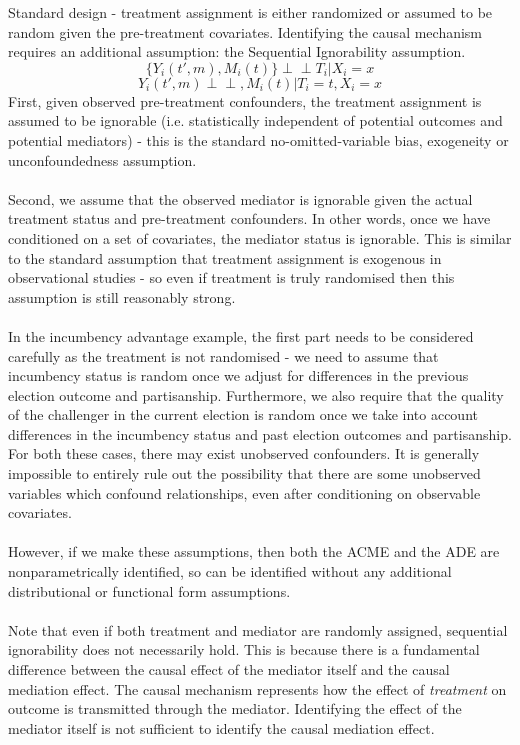 \documentclass{article}
\newcommand{\indep}{\perp\!\!\!\!\perp}
\begin{document}
	Standard design - treatment assignment is either randomized or assumed to be random given the pre-treatment covariates. Identifying the causal mechanism requires an additional assumption: the Sequential Ignorability assumption. 
	\begin{equation}
		\{Y_i(t',m), M_i(t)\} \indep T_i | X_i = x 
	\end{equation}
	\begin{equation}
		Y_i(t',m) \indep , M_i(t) | T_i =t, X_i = x 
	\end{equation}
	First, given observed pre-treatment confounders, the treatment assignment is assumed to be ignorable (i.e. statistically independent of potential outcomes and potential mediators) - this is the standard no-omitted-variable bias, exogeneity or unconfoundedness assumption. 
	\\~\\
	Second, we assume that the observed mediator is ignorable given the actual treatment status and pre-treatment confounders. In other words, once we have conditioned on a set of covariates, the mediator status is ignorable. This is similar to the standard assumption that treatment assignment is exogenous in observational studies - so even if treatment is truly randomised then this assumption is still reasonably strong. 
	\\~\\
	In the incumbency advantage example, the first part needs to be considered carefully as the treatment is not randomised - we need to assume that incumbency status is random once we adjust for differences in the previous election outcome and partisanship. Furthermore, we also require that the quality of the challenger in the current election is random once we take into account differences in the incumbency status and past election outcomes and partisanship. For both these cases, there may exist unobserved confounders. It is generally impossible to entirely rule out the possibility that there are some unobserved variables which confound relationships, even after conditioning on observable covariates. 
	\\~\\
	However, if we make these assumptions, then both the ACME and the ADE are nonparametrically identified, so can be identified without any additional distributional or functional form assumptions. 
	\\~\\
	Note that even if both treatment and mediator are randomly assigned, sequential ignorability does not necessarily hold. This is because there is a fundamental difference between the causal effect of the mediator itself and the causal mediation effect. The causal mechanism represents how the effect of \textit{treatment} on outcome is transmitted through the mediator. Identifying the effect of the mediator itself is not sufficient to identify the causal mediation effect. 
\end{document}

